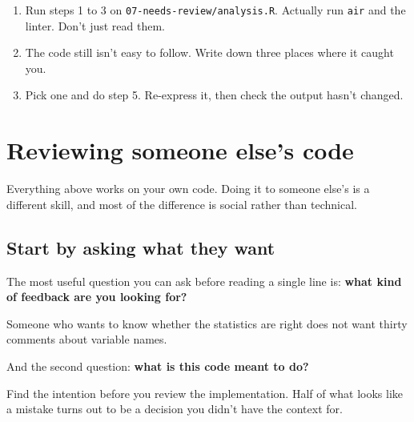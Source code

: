 \documentclass[
  letterpaper,
  justified,
  a4paper]{tufte-book}
\providecommand{\tightlist}{%
  \setlength{\itemsep}{0pt}\setlength{\parskip}{0pt}}
\providecommand{\tightlist}{%
  \setlength{\itemsep}{0pt}\setlength{\parskip}{0pt}}
\begin{document}
\begin{tcolorbox}[enhanced jigsaw, arc=.35mm, bottomrule=.15mm, bottomtitle=1mm, breakable, colback=white, colbacktitle=quarto-callout-note-color!10!white, colframe=quarto-callout-note-color-frame, coltitle=black, left=2mm, leftrule=.75mm, opacityback=0, opacitybacktitle=0.6, rightrule=.15mm, title=\textcolor{quarto-callout-note-color}{\faInfo}\hspace{0.5em}{Your Turn}, titlerule=0mm, toprule=.15mm, toptitle=1mm]

\begin{enumerate}
\def\labelenumi{\arabic{enumi}.}
\tightlist
\item
  Run steps 1 to 3 on \texttt{07-needs-review/analysis.R}. Actually run
  \texttt{air} and the linter. Don't just read them.
\item
  The code still isn't easy to follow. Write down three places where it
  caught you.
\item
  Pick one and do step 5. Re-express it, then check the output hasn't
  changed.
\end{enumerate}

\end{tcolorbox}

\section{Reviewing someone else's
code}\label{reviewing-someone-elses-code}

Everything above works on your own code. Doing it to someone else's is a
different skill, and most of the difference is social rather than
technical.

\subsection{Start by asking what they
want}\label{start-by-asking-what-they-want}

The most useful question you can ask before reading a single line is:
\textbf{what kind of feedback are you looking for?}

Someone who wants to know whether the statistics are right does not want
thirty comments about variable names.

And the second question: \textbf{what is this code meant to do?}

Find the intention before you review the implementation. Half of what
looks like a mistake turns out to be a decision you didn't have the
context for.
\end{document}
